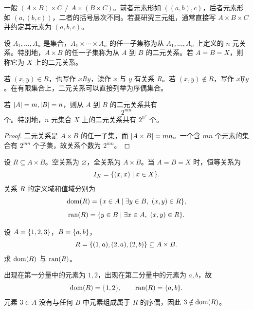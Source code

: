 \begin{pitfall}[笛卡儿积不满足普通结合律]\label{ch2-cartesian-assoc-pitfall}
一般 $(A\times B)\times C\ne A\times(B\times C)$。前者元素形如 $((a,b),c)$，后者元素形如 $(a,(b,c))$，二者的括号层次不同。若要研究三元组，通常直接写 $A\times B\times C$ 并约定其元素为 $(a,b,c)$。
\end{pitfall}

\begin{definition}[$n$ 元关系与二元关系]\label{ch2-relation}
设 $A_1,\ldots,A_n$ 是集合，$A_1\times\cdots\times A_n$ 的任一子集称为从 $A_1,\ldots,A_n$ 上定义的 $n$ 元关系。特别地，$A\times B$ 的任一子集称为从 $A$ 到 $B$ 的二元关系。若 $A=B=X$，则称它为 $X$ 上的二元关系。
\end{definition}

若 $(x,y)\in R$，也写作 $xRy$，读作 $x$ 与 $y$ 有关系 $R$。若 $(x,y)\notin R$，写作 $x\not R y$。在有限集合上，二元关系可以直接列举为序偶集合。

\begin{theorem}[有限集上关系的个数]\label{ch2-relation-count}
若 $\lvert A\rvert=m,\lvert B\rvert=n$，则从 $A$ 到 $B$ 的二元关系共有
\[
  2^{mn}
\]
个。特别地，$n$ 元集合 $X$ 上的二元关系共有 $2^{n^2}$ 个。
\end{theorem}

\begin{proof}
二元关系是 $A\times B$ 的任一子集，而 $\lvert A\times B\rvert=mn$。一个含 $mn$ 个元素的集合有 $2^{mn}$ 个子集，故关系个数为 $2^{mn}$。
\end{proof}

\begin{definition}\label{ch2-special-relations}
设 $R\subseteq A\times B$。空关系为 $\varnothing$，全关系为 $A\times B$。当 $A=B=X$ 时，恒等关系为
\[
  I_X=\{(x,x)\mid x\in X\}.
\]
关系 $R$ 的定义域和值域分别为
\[
  \operatorname{dom}(R)=\{x\in A\mid \exists y\in B,\ (x,y)\in R\},
\]
\[
  \operatorname{ran}(R)=\{y\in B\mid \exists x\in A,\ (x,y)\in R\}.
\]
\end{definition}

\begin{example}[title={列举关系并求定义域和值域}]\label{ch2-relation-list}
设 $A=\{1,2,3\}$，$B=\{a,b\}$，
\[
  R=\{(1,a),(2,a),(2,b)\}\subseteq A\times B.
\]
求 $\operatorname{dom}(R)$ 与 $\operatorname{ran}(R)$。
\begin{solution}
出现在第一分量中的元素为 $1,2$，出现在第二分量中的元素为 $a,b$，故
\[
  \operatorname{dom}(R)=\{1,2\},\qquad \operatorname{ran}(R)=\{a,b\}.
\]
元素 $3\in A$ 没有与任何 $B$ 中元素组成属于 $R$ 的序偶，因此 $3\notin\operatorname{dom}(R)$。
\end{solution}
\end{example}

